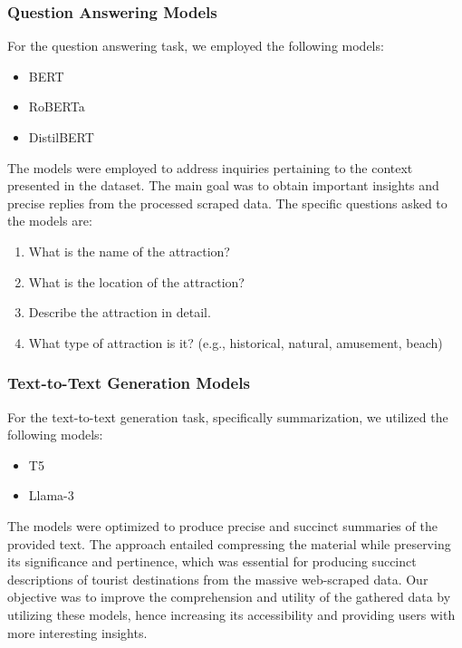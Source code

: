 \documentclass[conference]{IEEEtran}
\begin{document}
        \subsubsection{Question Answering Models}

        For the question answering task, we employed the following models:
        \begin{itemize}
            \item BERT
            \item RoBERTa
            \item DistilBERT
        \end{itemize}

        The models were employed to address inquiries pertaining to the context presented in the dataset. The main goal was to obtain important insights and precise replies from the processed scraped data. The specific questions asked to the models are:

\begin{mdframed}[linewidth=1pt, innerleftmargin=15pt, innerrightmargin=15pt, innertopmargin=15pt, innerbottommargin=15pt]
\begin{enumerate}
\item What is the name of the attraction?
\item What is the location of the attraction?
\item Describe the attraction in detail.
\item What type of attraction is it? (e.g., historical, natural, amusement, beach)
\end{enumerate}
\end{mdframed}


        \subsubsection{Text-to-Text Generation Models}

        For the text-to-text generation task, specifically summarization, we utilized the following models:
        \begin{itemize}
            \item T5
            \item Llama-3
        \end{itemize}

        The models were optimized to produce precise and succinct summaries of the provided text. The approach entailed compressing the material while preserving its significance and pertinence, which was essential for producing succinct descriptions of tourist destinations from the massive web-scraped data.
        Our objective was to improve the comprehension and utility of the gathered data by utilizing these models, hence increasing its accessibility and providing users with more interesting insights.
\end{document}

